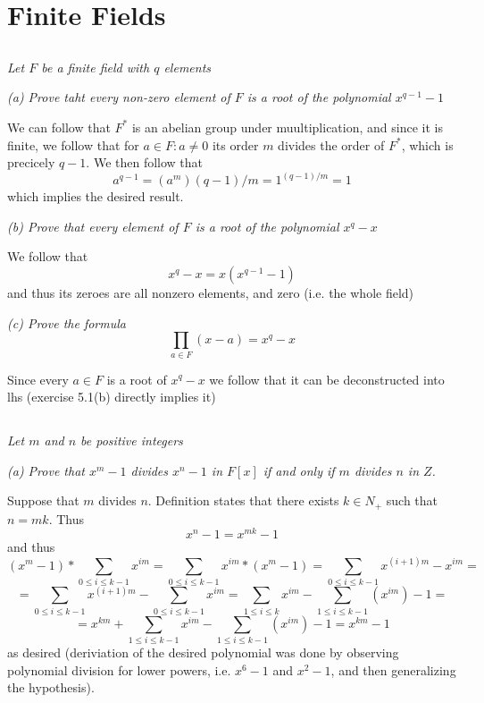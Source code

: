 \documentclass[11pt,oneside,titlepage]{book}
\begin{document}
\section{Finite Fields}

\subsection{}

\textit{Let $F$ be a finite field with $q$ elements}

\textit{(a) Prove taht every non-zero element of $F$ is a root of the
polynomial $x^{q - 1} - 1$}

We can follow that $F^*$ is an abelian group under muultiplication,
and since it is finite, we follow that for $a \in F: a \neq 0$
its order $m$ divides the order of $F^*$, which is precicely $q - 1$.
We then follow that
$$a^{q - 1} = (a^m){(q - 1) / m} = 1^{(q - 1) / m} = 1$$
which implies the desired result.

\textit{(b) Prove that every element of $F$ is a root
  of the polynomial $x^q - x$}

We follow that
$$x^q - x = x(x^{q - 1} - 1)$$
and thus its zeroes are all nonzero elements, and zero
(i.e. the whole field)

\textit{(c) Prove the formula $$\prod_{a \in F}{(x - a)} = x^q - x$$ }

Since every $a \in F$ is a root of $x^q  - x$ we follow that
it can be deconstructed into lhs (exercise 5.1(b) directly implies it)


\subsection{}

\textit{Let $m$ and $n$ be positive integers}

\textit{(a) Prove that $x^m - 1$ divides $x^n - 1$ in $F[x]$ if and
  only if $m$ divides $n$ in $Z$.}

Suppose that $m$ divides $n$. Definition states that there exists
$k \in N_+$ such that $n = mk$. Thus
$$x^n - 1 = x^{mk} - 1$$
and thus
$$(x^m - 1) * \sum_{0 \leq i \leq k - 1}{x^{im}} =
\sum_{0 \leq i \leq k - 1}{x^{im} * (x^m - 1)} =
\sum_{0 \leq i \leq k - 1}{x^{(i + 1)m} - x^{im}} =
$$
$$ =
\sum_{0 \leq i \leq k - 1}{x^{(i + 1)m}} - \sum_{0 \leq i \leq k - 1}{x^{im}} =
\sum_{1 \leq i \leq k}{x^{im}} - \sum_{1 \leq i \leq k - 1}{(x^{im})} - 1 = $$
$$ =
x^{km} + \sum_{1 \leq i \leq k - 1}{x^{im}} - \sum_{1 \leq i \leq k - 1}{(x^{im})} - 1 =
x^{km} - 1
$$
as desired (deriviation of the desired polynomial was done by
observing polynomial division for lower powers, i.e. $x^6 - 1$ and
$x^2 - 1$, and then generalizing the hypothesis).
\end{document}
